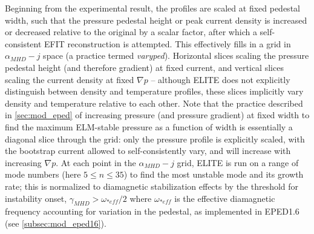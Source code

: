 Beginning from the experimental result, the profiles are scaled at fixed pedestal width, such that the pressure pedestal height or peak current density is increased or decreased relative to the original by a scalar factor, after which a self-consistent EFIT reconstruction is attempted.  This effectively fills in a grid in $\alpha_{MHD} - j$ space (a practice termed \emph{varyped}).  Horizontal slices scaling the pressure pedestal height (and therefore gradient) at fixed current, and vertical slices scaling the current density at fixed $\nabla p$ -- although ELITE does not explicitly distinguish between density and temperature profiles, these slices implicitly vary density and temperature relative to each other.  Note that the practice described in \cref{sec:mod_eped} of increasing pressure (and pressure gradient) at fixed width to find the maximum ELM-stable pressure as a function of width is essentially a diagonal slice through the grid: only the pressure profile is explicitly scaled, with the bootstrap current allowed to self-consistently vary, and will increase with increasing $\nabla p$.  At each point in the $\alpha_{MHD} - j$ grid, ELITE is run on a range of mode numbers (here $5 \le n \le 35$) to find the most unstable mode and its growth rate; this is normalized to diamagnetic stabilization effects by the threshold for instability onset, $\gamma_{MHD} > \omega_{*eff}/2$ where $\omega_{*eff}$ is the effective diamagnetic frequency accounting for variation in the pedestal, as implemented in EPED1.6 (see \cref{subsec:mod_eped16}).

